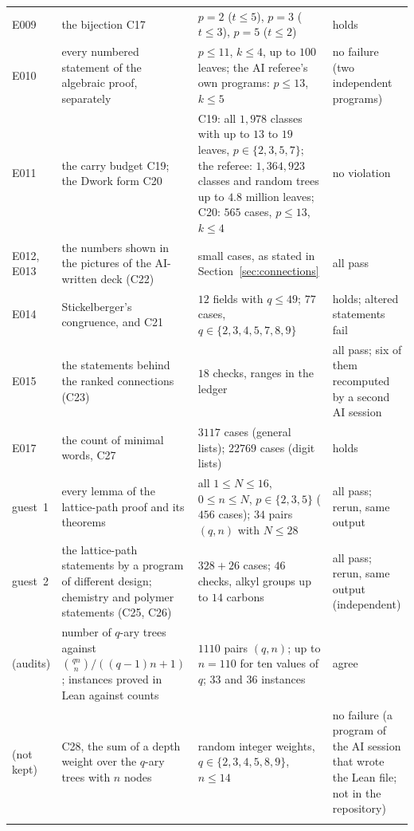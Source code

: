 \documentclass[11pt]{article}
\theoremstyle{definition}
\theoremstyle{remark}
\numberwithin{equation}{section}
\numberwithin{figure}{section}
\begin{document}
{\begin{longtable}{@{}>{\raggedright\arraybackslash}p{}>{\raggedright\arraybackslash}p{}>{\raggedright\arraybackslash}p{}>{\raggedright\arraybackslash}p{}@{}}
E009 & the bijection C17 & $p=2$ ($t\le5$), $p=3$ ($t\le3$), $p=5$ ($t\le2$) & holds\\\addlinespace[3pt]
E010 & every numbered statement of the algebraic proof, separately & $p\le11$, $k\le4$, up to $100$ leaves;
 the AI referee's own programs: $p\le13$, $k\le5$ & no failure (two independent programs)\\\addlinespace[3pt]
E011 & the carry budget C19; the Dwork form C20 & C19: all $1{,}978$ classes with up to $13$ to $19$
 leaves, $p\in\{2,3,5,7\}$; the referee: $1{,}364{,}923$ classes and random trees up to $4.8$ million leaves;
 C20: $565$ cases, $p\le13$, $k\le4$ & no violation\\\addlinespace[3pt]
E012, E013 & the numbers shown in the pictures of the AI-written deck (C22) & small cases, as stated in
 Section~\ref{sec:connections} & all pass\\\addlinespace[3pt]
E014 & Stickelberger's congruence, and C21 & $12$ fields with $q\le49$; $77$ cases,
 $q\in\{2,3,4,5,7,8,9\}$ & holds; altered statements fail\\\addlinespace[3pt]
E015 & the statements behind the ranked connections (C23) & $18$ checks, ranges in the ledger & all pass; six
 of them recomputed by a second AI session\\\addlinespace[3pt]
E017 & the count of minimal words, C27 & $3117$ cases (general lists); $22769$ cases (digit lists) & holds\\\addlinespace[3pt]
guest~1 & every lemma of the lattice-path proof and its theorems & all $1\le N\le16$, $0\le n\le N$,
 $p\in\{2,3,5\}$ ($456$ cases); $34$ pairs $(q,n)$ with $N\le28$ & all pass; rerun, same output\\\addlinespace[3pt]
guest~2 & the lattice-path statements by a program of different design; chemistry and polymer statements
 (C25, C26) & $328+26$ cases; $46$ checks, alkyl groups up to $14$ carbons & all pass; rerun, same output
 (independent)\\\addlinespace[3pt]
(audits) & number of $q$-ary trees against $\binom{qn}{n}/((q-1)n+1)$; instances proved in Lean against
 counts & $1110$ pairs $(q,n)$; up to $n=110$ for ten values of $q$; $33$ and $36$ instances & agree\\\addlinespace[3pt]
(not kept) & C28, the sum of a depth weight over the $q$-ary trees with $n$ nodes & random integer weights,
 $q\in\{2,3,4,5,8,9\}$, $n\le14$ & no failure (a program of the AI session that wrote the Lean file; not in
 the repository)\\\addlinespace[3pt]

\end{longtable}}
\end{document}
